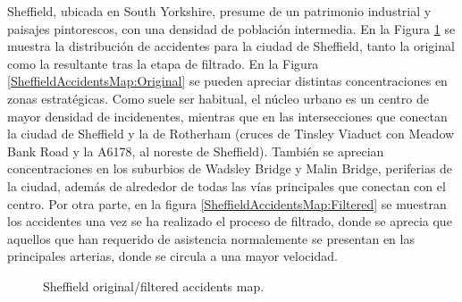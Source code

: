 \documentclass{uathesis-es}
\begin{document}
{Sheffield, ubicada en South Yorkshire, presume de un patrimonio industrial y paisajes pintorescos, con una densidad de población intermedia. En la Figura \ref{SheffieldAccidentsMap} se muestra la distribución de accidentes para la ciudad de Sheffield, tanto la original como la resultante tras la etapa de filtrado. En la Figura \ref{SheffieldAccidentsMap:Original} se pueden apreciar distintas concentraciones en zonas estratégicas. Como suele ser habitual, el núcleo urbano es un centro de mayor densidad de incidenentes, mientras que en las intersecciones que conectan la ciudad de Sheffield y la de Rotherham (cruces de Tinsley Viaduct con Meadow Bank Road y la A6178, al noreste de Sheffield). También se aprecian concentraciones en los suburbios de Wadsley Bridge y Malin Bridge, periferias de la ciudad, además de alrededor de todas las vías principales que conectan con el centro. Por otra parte, en la figura \ref{SheffieldAccidentsMap:Filtered} se muestran los accidentes una vez se ha realizado el proceso de filtrado, donde se aprecia que aquellos que han requerido de asistencia normalemente se presentan en las principales arterias, donde se circula a una mayor velocidad.

 \begin{figure}[H]
     \centering
     \caption{Sheffield original/filtered accidents map.}
     \label{SheffieldAccidentsMap}
 \end{figure}


}
\end{document}
